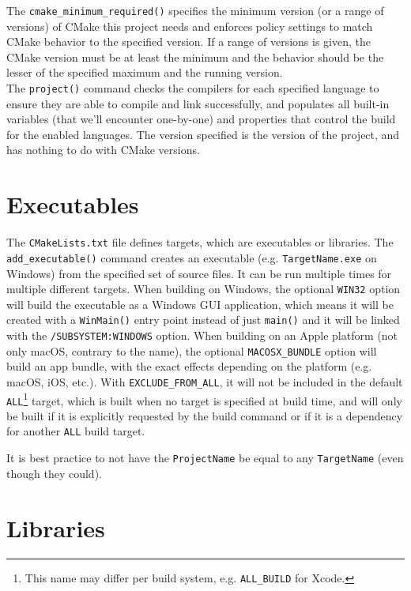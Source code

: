 \documentclass[8pt, table, xcdraw]{article}%
\begin{document}
The \lstinline{cmake_minimum_required()} specifies the minimum version (or a range of versions) of CMake this project needs and enforces policy settings to match CMake behavior to the specified version. If a range of versions is given, the CMake version must be at least the minimum and the behavior should be the lesser of the specified maximum and the running version.\\
The \lstinline{project()} command checks the compilers for each specified language to ensure they are able to compile and link successfully, and populates all built-in variables (that we'll encounter one-by-one) and properties that control the build for the enabled languages. The version specified is the version of the project, and has nothing to do with CMake versions.

\section{Executables}

The \lstinline{CMakeLists.txt} file defines targets, which are executables or libraries. The \lstinline{add_executable()} command creates an executable (e.g. \lstinline{TargetName.exe} on Windows) from the specified set of source files. It can be run multiple times for multiple different targets. When building on Windows, the optional \lstinline{WIN32} option will build the executable as a Windows GUI application, which means it will be created with a \lstinline{WinMain()} entry point instead of just \lstinline{main()} and it will be linked with the \lstinline{/SUBSYSTEM:WINDOWS} option. When building on an Apple platform (not only macOS, contrary to the name), the optional \lstinline{MACOSX_BUNDLE} option will build an app bundle, with the exact effects depending on the platform (e.g. macOS, iOS, etc.). With \lstinline{EXCLUDE_FROM_ALL}, it will not be included in the default \lstinline{ALL}\footnote{This name may differ per build system, e.g. \lstinline{ALL_BUILD} for Xcode.} target, which is built when no target is specified at build time, and will only be built if it is explicitly requested by the build command or if it is a dependency for another \lstinline{ALL} build target.

It is best practice to not have the \lstinline{ProjectName} be equal to any \lstinline{TargetName} (even though they could).

\section{Libraries}
\end{document}
